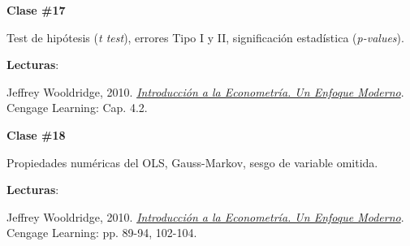\documentclass[letterpaper]{article}
\renewenvironment{itemize}{
  \begin{list}{}{
    \setlength{\leftmargin}{1.5em}
  }
}{
  \end{list}
}
\begin{document}
\begin{enumerate}
			\begin{itemize} 
				\item[$\bullet$] {\bf Clase \#17}
					\begin{itemize} 
						\item[$\circ$] Test de hip\'otesis (\emph{t test}), errores Tipo I y II,  significaci\'on estad\'istica (\emph{p-values}). %
						\item[$\circ$] {\bf Lecturas}: 
							\begin{itemize}
								\item[$\diamond$] Jeffrey Wooldridge, 2010. \href{https://github.com/hbahamonde/Metodos_de_Investigacion/raw/master/Readings/Wooldridge.pdf}{\emph{Introducci\'on a la Econometr\'ia. Un Enfoque Moderno}}. Cengage Learning: Cap. 4.2.
							\end{itemize}
					\end{itemize}
			\end{itemize}



			\begin{itemize} 
				\item[$\bullet$] {\bf Clase \#18}
					\begin{itemize} 
						\item[$\circ$] Propiedades num\'ericas del OLS, Gauss-Markov, sesgo de variable omitida. %
						\item[$\circ$] {\bf Lecturas}: 
							\begin{itemize} 
								\item[$\diamond$] Jeffrey Wooldridge, 2010. \href{https://github.com/hbahamonde/Metodos_de_Investigacion/raw/master/Readings/Wooldridge.pdf}{\emph{Introducci\'on a la Econometr\'ia. Un Enfoque Moderno}}. Cengage Learning: pp. 89-94, 102-104.
							\end{itemize}
					\end{itemize}
			\end{itemize}




\end{enumerate}
\end{document}

